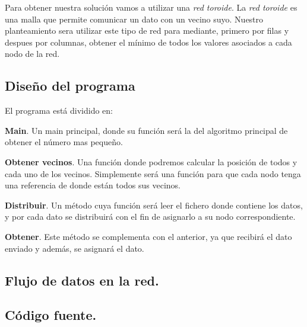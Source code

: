 \documentclass{article}
\begin{document}
Para obtener nuestra solución vamos a utilizar una \textit{red toroide}. La \textit{red toroide} es una malla que permite comunicar un dato con un vecino suyo. Nuestro planteamiento sera utilizar este tipo de red para mediante, primero por filas y despues por columnas, obtener el mínimo de todos los valores asociados a cada nodo de la red.


\subsection{Diseño del programa}

El programa está dividido en: 
\begin{list}{•}{}
\item \textbf{Main}. Un main principal, donde su función será la del algoritmo principal de obtener el número mas pequeño.
\item \textbf{Obtener vecinos}. Una función donde podremos calcular la posición de todos y cada uno de los vecinos. Simplemente será una función para que cada nodo tenga una referencia de donde están todos sus vecinos.
\item \textbf{Distribuir}. Un método cuya función será leer el fichero donde contiene los datos, y por cada dato se distribuirá con el fin de asignarlo a su nodo correspondiente.
\item \textbf{Obtener}. Este método se complementa con el anterior, ya que recibirá el dato enviado y además, se asignará el dato.
\end{list}

\subsection{Flujo de datos en la red.}

\subsection{Código fuente.}
\end{document}
